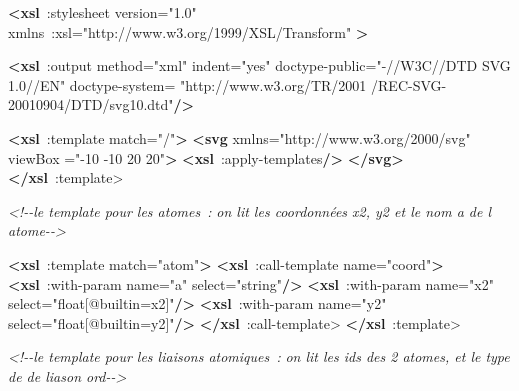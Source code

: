 \documentclass[
]{book}
\newenvironment{Shaded}{\begin{snugshade}}{\end{snugshade}}
\newcommand{\CommentTok}[1]{\textcolor[rgb]{0.56,0.35,0.01}{\textit{#1}}}
\newcommand{\KeywordTok}[1]{\textcolor[rgb]{0.13,0.29,0.53}{\textbf{#1}}}
\newcommand{\NormalTok}[1]{#1}
\newcommand{\OtherTok}[1]{\textcolor[rgb]{0.56,0.35,0.01}{#1}}
\newcommand{\StringTok}[1]{\textcolor[rgb]{0.31,0.60,0.02}{#1}}
\begin{document}
\begin{Shaded}
\begin{Highlighting}[]
\KeywordTok{\textless{}xsl}\OtherTok{ :stylesheet}
\OtherTok{    version=}\StringTok{"1.0"}
\OtherTok{    xmlns :xsl=}\StringTok{"http://www.w3.org/1999/XSL/Transform"}\OtherTok{ }\KeywordTok{\textgreater{}}

  \KeywordTok{\textless{}xsl}\OtherTok{ :output}
\OtherTok{      method=}\StringTok{"xml"}
\OtherTok{      indent=}\StringTok{"yes"}
\OtherTok{      doctype{-}public=}\StringTok{"{-}//W3C//DTD SVG 1.0//EN"}
\OtherTok{      doctype{-}system=}
\StringTok{"http://www.w3.org/TR/2001}
\StringTok{/REC{-}SVG{-}20010904/DTD/svg10.dtd"}\KeywordTok{/\textgreater{}}

  \KeywordTok{\textless{}xsl}\OtherTok{ :template match=}\StringTok{"/"}\KeywordTok{\textgreater{}}
    \KeywordTok{\textless{}svg}
\OtherTok{ xmlns=}\StringTok{"http://www.w3.org/2000/svg"}
\OtherTok{ viewBox =}\StringTok{"{-}10 {-}10 20 20"}\KeywordTok{\textgreater{}}
      \KeywordTok{\textless{}xsl}\OtherTok{ :apply{-}templates}\KeywordTok{/\textgreater{}}
    \KeywordTok{\textless{}/svg\textgreater{}}
  \KeywordTok{\textless{}/xsl}\NormalTok{ :template\textgreater{}}


  \CommentTok{\textless{}!{-}{-}le template pour les atomes :}
\CommentTok{      on lit les coordonnées x2, y2 et le nom a de l atome{-}{-}\textgreater{}}

  \KeywordTok{\textless{}xsl}\OtherTok{ :template match=}\StringTok{"atom"}\KeywordTok{\textgreater{}}
    \KeywordTok{\textless{}xsl}\OtherTok{ :call{-}template name=}\StringTok{"coord"}\KeywordTok{\textgreater{}}
      \KeywordTok{\textless{}xsl}\OtherTok{ :with{-}param name=}\StringTok{"a"}
\OtherTok{        select=}\StringTok{"string"}\KeywordTok{/\textgreater{}}
      \KeywordTok{\textless{}xsl}\OtherTok{ :with{-}param name=}\StringTok{"x2"}
\OtherTok{        select=}\StringTok{"float[@builtin=\textquotesingle{}x2\textquotesingle{}]"}\KeywordTok{/\textgreater{}}
      \KeywordTok{\textless{}xsl}\OtherTok{ :with{-}param name=}\StringTok{"y2"}
\OtherTok{        select=}\StringTok{"float[@builtin=\textquotesingle{}y2\textquotesingle{}]"}\KeywordTok{/\textgreater{}}
    \KeywordTok{\textless{}/xsl}\NormalTok{ :call{-}template\textgreater{}}
  \KeywordTok{\textless{}/xsl}\NormalTok{ :template\textgreater{}}


  \CommentTok{\textless{}!{-}{-}le template pour les liaisons atomiques :}
\CommentTok{      on lit les ids des 2 atomes, et le type de de liason ord{-}{-}\textgreater{}}


\end{Highlighting}
\end{Shaded}
\end{document}
